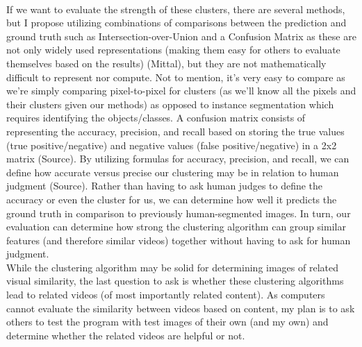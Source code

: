 \documentclass[10pt,twocolumn]{article}
\begin{document}
\\
\indent
If we want to evaluate the strength of these clusters, there are several methods, but I propose utilizing combinations of comparisons between the prediction and ground truth such as Intersection-over-Union and a Confusion Matrix as these are not only widely used representations (making them easy for others to evaluate themselves based on the results) (Mittal), but they are not mathematically difficult to represent nor compute. Not to mention, it’s very easy to compare as we’re simply comparing pixel-to-pixel for clusters (as we’ll know all the pixels and their clusters given our methods) as opposed to instance segmentation which requires identifying the objects/classes.
A confusion matrix consists of representing the accuracy, precision, and recall based on storing the true values (true positive/negative) and negative values (false positive/negative) in a 2x2 matrix (Source). By utilizing formulas for accuracy, precision, and recall, we can define how accurate versus precise our clustering may be in relation to human judgment (Source). Rather than having to ask human judges to define the accuracy or even the cluster for us, we can determine how well it predicts the ground truth in comparison to previously human-segmented images. In turn, our evaluation can determine how strong the clustering algorithm can group similar features (and therefore similar videos) together without having to ask for human judgment.
\\
\indent
	While the clustering algorithm may be solid for determining images of related visual similarity, the last question to ask is whether these clustering algorithms lead to related videos (of most importantly related content). As computers cannot evaluate the similarity between videos based on content, my plan is to ask others to test the program with test images of their own (and my own) and determine whether the related videos are helpful or not.









\printbibliography
\end{document}
